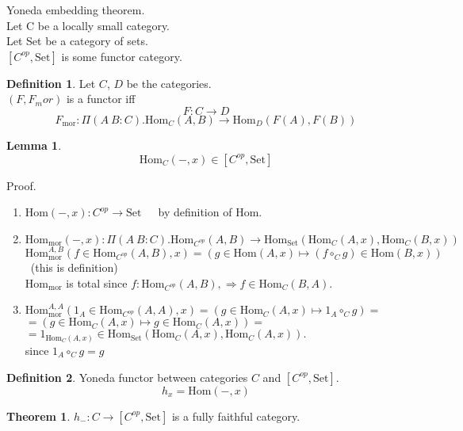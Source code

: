 \documentclass[10pt,a4paper]{article}
\theoremstyle{definition}
\newtheorem{definition}{Definition}[section]
\newtheorem{lemma}{Lemma}[section]
\newtheorem{theorem}{Theorem}[section]
\newcommand{\Hom}{{\mbox{Hom}}}
\newcommand{\mor}{{\mbox{mor}}}
\newcommand{\Set}{{\mbox{Set}}}
\newcommand{\ra}{{\rightarrow}}
\begin{document}
Yoneda embedding theorem.\\
Let C be a locally small category.\\
Let Set be a category of sets.\\
$[C^{op},\mbox{Set}]$ is some functor category.\\

\begin{definition}
Let $C$, $D$ be the categories.\\
 $(F, F_mor)$ is a functor iff\\
$$F:C \ra D$$
$$F_\mor:\Pi(A\ B:C).\Hom_C(A,B) \ra \Hom_D(F(A), F(B))$$
\end{definition}

\begin{lemma}
$$\Hom_C(-, x) \in [C^{op},\Set]$$
\end{lemma}
Proof.\\
\begin{enumerate}
\item $\Hom(-, x) : C^{op} \ra \Set$\ \ \ by definition of $\Hom$.
\item $\Hom_\mor(-, x) :\Pi(A\ B:C).\Hom_{C^{op}}(A,B) \ra \Hom_\Set(\Hom_C(A,x), \Hom_C(B,x))$\\
$\Hom_\mor^{A,B}(f\in\Hom_{C^{op}}(A,B), x) = (g \in\Hom(A,x) \mapsto (f \circ_C g) \in\Hom(B,x))$\ (this is definition)\\
$\Hom_\mor$ is total since $f:\Hom_{C^{op}}(A,B), \Rightarrow f\in\Hom_C(B,A).$
\item $\Hom_\mor^{A,A}(1_A\in\Hom_{C^{op}}(A,A), x) = \left(g \in\Hom_C(A,x)\mapsto 1_A \circ_C g\right) = $\\
$= \left(g \in\Hom_C(A,x) \mapsto g \in\Hom_C(A,x)\right) =$\\
$= 1_{\Hom_C(A,x)} \in \Hom_\Set\left(\Hom_C(A,x), \Hom_C(A,x)\right).$\\
since $1_A \circ_C g = g$\\
\end{enumerate}



\begin{definition}
Yoneda functor between categories $C$ and $[C^{op},\Set]$.
$$h_x = \Hom(-, x)$$
\end{definition}
\begin{theorem}
$h_{-}:C\rightarrow [C^{op},\Set]$ is a fully faithful category.
\end{theorem}
\end{document}

